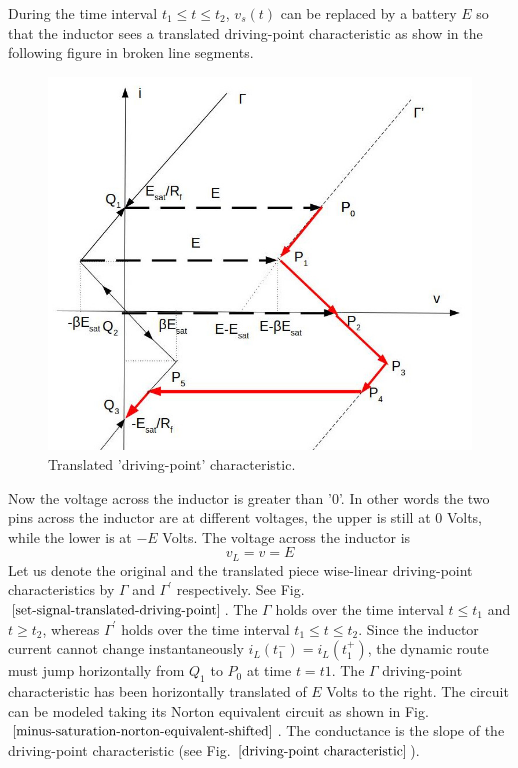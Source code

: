 \documentclass[letterpaper,11pt]{article}
\begin{document}
During the  time interval $t_1 \leq t \leq t_2$, $v_s(t)$ can be replaced by a battery $E$ so that the inductor sees a translated driving-point characteristic as show in the following figure in broken line segments.
%
\begin{figure}[!ht]
        \centering \includegraphics[width=0.9\columnwidth]{driving-point-characteristic-shifted.jpg}
        \caption{\label{set-signal-translated-driving-point}Translated 'driving-point' characteristic.
        }
\end{figure}
Now the voltage across the inductor is greater than '0'. In other words the two pins across the inductor are at different voltages, the upper is still at $0$ Volts, while the lower is at $-E$ Volts. The voltage across the inductor is
\begin{equation}
    v_L=v=E
\end{equation}
Let us denote the original and the translated piece wise-linear driving-point characteristics by $\Gamma$ and $\Gamma^{'}$ respectively. See Fig. $\ref{set-signal-translated-driving-point}$. The $\Gamma$ holds over the time interval $t \leq t_1$ and $t\geq t_2$, whereas $\Gamma^{'}$ holds over the time interval $t_1 \leq t \leq t_2$.
Since the inductor current cannot change instantaneously $i_L(t_1^{-})=i_L(t_1^{+})$, the dynamic route must jump horizontally from $Q_1$ to $P_0$ at time $t=t1$. The $\Gamma$ driving-point characteristic has been horizontally translated of $E$ Volts to the right.
The circuit can be modeled taking its Norton equivalent circuit as shown in Fig. $\ref{minus-saturation-norton-equivalent-shifted}$. The conductance is the slope of the driving-point characteristic (see Fig. $\ref{driving-point characteristic}$).
\end{document}

